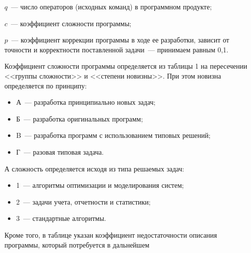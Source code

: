 $q$~--- число операторов (исходных команд) в программном продукте;

$c$~--- коэффициент сложности программы; 

$p$~--- коэффициент коррекции программы в ходе ее разработки, зависит от точности и корректности поставленной задачи~--- принимаем равным 0,1.

Коэффициент сложности программы определяется из таблицы 1 на пересечении <<группы сложности>> и <<степени новизны>>. При этом новизна определяется по принципу:
\begin{itemize}
\item А~--- разработка  принципиально новых задач;
\item Б~--- разработка  оригинальных  программ;
\item B~--- разработка  программ  с использованием типовых решений;
\item Г~--- разовая  типовая  задача.
\end{itemize}

А сложность определяется исходя из типа решаемых задач:
\begin{itemize}
\item 1~--- алгоритмы  оптимизации и моделирования  систем;
\item 2~--- задачи  учета,  отчетности  и  статистики;
\item 3~--- стандартные  алгоритмы.
\end{itemize}

Кроме того, в таблице указан коэффициент недостаточности описания программы, который потребуется в дальнейшем

